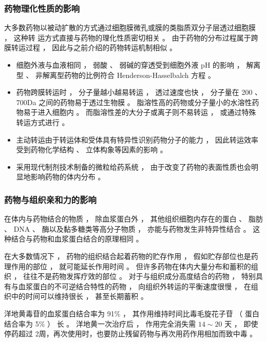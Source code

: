 \documentclass[dvipsnames, svgnames, x11names]{beamer}
\begin{document}
\begin{frame}
    \frametitle{药物理化性质的影响}
    大多数药物以被动扩散的方式通过细胞膜微孔或膜的类脂质双分子层透过细胞膜 ， 这种转
运方式直接与药物的理化性质密切相关 。 由于药物的分布过程属于跨膜转运过程 ， 因此与之前介绍的药物转运机制相似 。
\begin{itemize}
  \item 细胞外液与血液相同 ， 弱酸 、 弱碱的穿透受到细胞外液 pH 的影响 ， 解离型 、 非解离型药物的比例符合 Henderson-Hasselbalch 方程 。
  \item 药物跨膜转运时 ， 分子量越小越易转运 ， 透过速度也快 ， 分子量在 200 、 700Da 之间的药物易于透过生物膜 。 脂溶性高的药物或分子量小的水溶性药物易于进入细胞内 。 而脂溶性差的大分子或离子则不易转运 ， 或通过特殊转运方式进行 。
  \item 主动转运由于转运体和受体具有特异性识别药物分子的能力 ， 因此转运效率受到药物化学结构 、 立体构象等因素的影响 。
  \item 采用现代制剂技术制备的微粒给药系统 ， 由于改变了药物的表面性质也会明显地影响药物的体内分布 。 
\end{itemize}
\end{frame}


\begin{frame}
    \frametitle{药物与组织亲和力的影响}
    在体内与药物结合的物质 ， 除血浆蛋白外 ， 其他组织细胞内存在的蛋白 、 脂肪 、 DNA 、 酶以及黏多糖类等高分子物质 ， 亦能与药物发生非特异性结合 。 这种结合与药物和血浆蛋白结合的原理相同 。

    在大多数情况下 ， 药物的组织结合起着药物的贮存作用 ， 假如贮存部位也是药理作用的部位 ， 就可能延长作用时间 。 但许多药物在体内大量分布和蓄积的组织 ， 往往不是药物发挥疗效的部位 。 对于与组织成分高度结合的药物 ， 特别具有与血浆蛋白的不可逆结合特性的药物 ， 向组织外转运的平衡速度很慢 ， 在组织中的时间可以维持很长 ， 甚至长期蓄积 。 
    \begin{blankblock}{}
        洋地黄毒苷的血浆蛋白结合率为 91\% ， 其作用维持时间比毒毛旋花子苷 （ 蛋白结合率为 5\% ） 长 。 洋地黄一次治疗后 ， 作用完全消失需 $14\sim 20$ 天 ， 即使停药超过 2周，再次使用时，也要防止残留药物与再次用药作用相加而致中毒 。
    \end{blankblock}
\end{frame}
\end{document}
